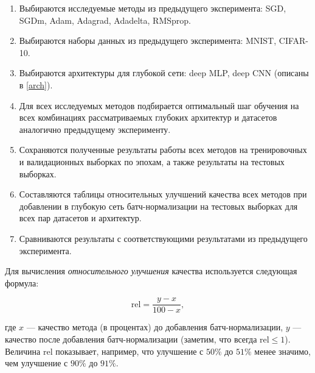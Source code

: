 \documentclass[12pt]{article}
\begin{document}
\begin{enumerate}
\item Выбираются исследуемые методы из предыдущего эксперимента: SGD, SGDm, Adam, Adagrad, Adadelta, RMSprop.
\item Выбираются наборы данных из предыдущего эксперимента: MNIST, CIFAR-10.
\item Выбираются архитектуры для глубокой сети: deep MLP, deep CNN (описаны в \ref{arch}).
\item Для всех исследуемых методов подбирается оптимальный шаг обучения на всех комбинациях рассматриваемых глубоких архитектур и датасетов аналогично предыдущему эксперименту.
\item Сохраняются полученные результаты работы всех методов на тренировочных и валидационных выборках по эпохам, а также результаты на тестовых выборках.
\item Составляются таблицы относительных улучшений качества всех методов при добавлении в глубокую сеть батч-нормализации на тестовых выборках для всех пар датасетов и архитектур.
\item Сравниваются результаты с соответствующими результатами из предыдущего эксперимента.
\end{enumerate}

Для вычисления \textit{относительного улучшения} качества используется следующая формула:

\begin{equation}
\mathrm{rel} = \frac{y - x}{100 - x},
\end{equation}

где $x$ --- качество метода (в процентах) до добавления батч-нормализации, $y$ --- качество после добавления батч-нормализации (заметим, что всегда $\mathrm{rel} \leq 1$). Величина $\mathrm{rel}$ показывает, например, что улучшение с $50 \%$ до $51 \%$ менее значимо, чем улучшение с $90 \%$ до $91 \%$.

%
\end{document}
